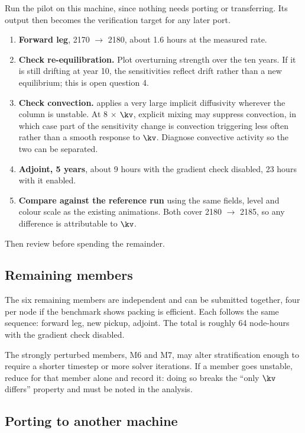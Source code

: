 Run the pilot on this machine, since nothing needs porting or transferring. Its
output then becomes the verification target for any later port.

\begin{enumerate}
  \item \textbf{Forward leg}, 2170 $\rightarrow$ 2180, about 1.6 hours at the
        measured rate.
  \item \textbf{Check re-equilibration.} Plot overturning strength over the ten
        years. If it is still drifting at year 10, the sensitivities reflect
        drift rather than a new equilibrium; this is open question 4.
  \item \textbf{Check convection.}  applies a very large
        implicit diffusivity wherever the column is unstable. At 8 $\times$
        $\kv$, explicit mixing may suppress convection, in which case part of the
        sensitivity change is convection triggering less often rather than a
        smooth response to $\kv$. Diagnose convective activity so the two can be
        separated.
  \item \textbf{Adjoint, 5 years}, about 9 hours with the gradient check
        disabled, 23 hours with it enabled.
  \item \textbf{Compare against the reference run} using the same fields, level
        and colour scale as the existing animations. Both cover
        2180 $\rightarrow$ 2185, so any difference is attributable to $\kv$.
\end{enumerate}

Then review before spending the remainder.

\subsection{Remaining members}

The six remaining members are independent and can be submitted together, four per
node if the benchmark shows packing is efficient. Each follows the same sequence:
forward leg, new pickup, adjoint. The total is roughly 64 node-hours with the
gradient check disabled.

The strongly perturbed members, M6 and M7, may alter stratification enough to
require a shorter timestep or more solver iterations. If a member goes unstable,
reduce  for that member alone and record it: doing so breaks the
``only $\kv$ differs'' property and must be noted in the analysis.

\subsection{Porting to another machine}

